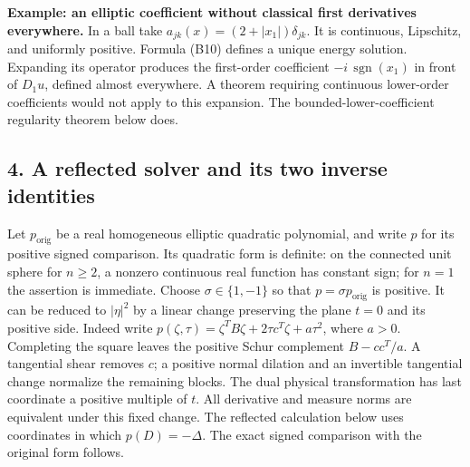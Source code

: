 \documentclass[
  11pt,
]{article}
\makeatletter
\let\ReaderOriginalAnchorStart\hyper@anchorstart
\let\ReaderOriginalAnchorEnd\hyper@anchorend
\let\ReaderPendingAliases\@empty
\def\ReaderArmAliases#1{\gdef\ReaderPendingAliases{#1}}
\def\hyper@anchorstart#1{\ReaderIfNativeAnchorTF{#1}{\ReaderPendingAliases\global\let\ReaderPendingAliases\@empty}{}\ReaderOriginalAnchorStart{#1}}
\makeatother
\begin{document}
\textbf{Example: an elliptic coefficient without classical first
derivatives everywhere.} In a ball take
\(a_{jk}(x)=(2+|x_1|)\delta_{jk}\). It is continuous, Lipschitz, and
uniformly positive. Formula (B10) defines a unique energy solution.
Expanding its operator produces the first-order coefficient
\(-i\,\operatorname{sgn}(x_1)\) in front of \(D_1u\), defined almost
everywhere. A theorem requiring continuous lower-order coefficients
would not apply to this expansion. The bounded-lower-coefficient
regularity theorem below does.

\ReaderArmAliases{\ReaderOriginalAnchorStart{AN03-SBD-004}\ReaderOriginalAnchorEnd\begingroup\expandafter\def\csname @currentHref\endcsname{AN03-SBD-004}\label{AN03-SBD-004}\endgroup\ReaderOriginalAnchorStart{an03-sbd-004-a-reflected-solver-and-its-two-inverse-identities}\ReaderOriginalAnchorEnd\begingroup\expandafter\def\csname @currentHref\endcsname{an03-sbd-004-a-reflected-solver-and-its-two-inverse-identities}\label{an03-sbd-004-a-reflected-solver-and-its-two-inverse-identities}\endgroup\ReaderOriginalAnchorStart{4-a-reflected-solver-and-its-two-inverse-identities}\ReaderOriginalAnchorEnd\begingroup\expandafter\def\csname @currentHref\endcsname{4-a-reflected-solver-and-its-two-inverse-identities}\label{4-a-reflected-solver-and-its-two-inverse-identities}\endgroup\ReaderOriginalAnchorStart{a-reflected-solver-and-its-two-inverse-identities}\ReaderOriginalAnchorEnd}
\subsection{4. A reflected solver and its two inverse
identities}\label{a-reflected-solver-and-its-two-inverse-identities}

Let \(p_{\mathrm{orig}}\) be a real homogeneous elliptic quadratic
polynomial, and write \(p\) for its positive signed comparison. Its
quadratic form is definite: on the connected unit sphere for \(n\geq2\),
a nonzero continuous real function has constant sign; for \(n=1\) the
assertion is immediate. Choose \(\sigma\in\{1,-1\}\) so that
\(p=\sigma p_{\mathrm{orig}}\) is positive. It can be reduced to
\(|\eta|^2\) by a linear change preserving the plane \(t=0\) and its
positive side. Indeed write
\(p(\zeta,\tau)=\zeta^TB\zeta+2\tau c^T\zeta+a\tau^2\), where \(a>0\).
Completing the square leaves the positive Schur complement \(B-cc^T/a\).
A tangential shear removes \(c\); a positive normal dilation and an
invertible tangential change normalize the remaining blocks. The dual
physical transformation has last coordinate a positive multiple of
\(t\). All derivative and measure norms are equivalent under this fixed
change. The reflected calculation below uses coordinates in which
\(p(D)=-\Delta\). The exact signed comparison with the original form
follows.
\end{document}
